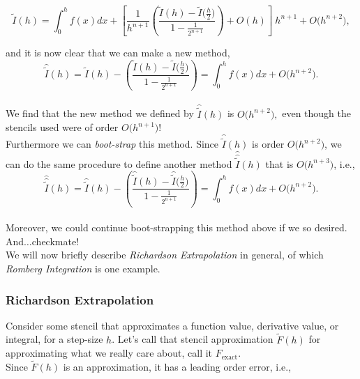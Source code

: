 \documentclass[paper=a4, fontsize=11pt]{scrartcl} %
\numberwithin{equation}{section} %
\numberwithin{figure}{section} %
\numberwithin{table}{section} %
\begin{document}
 $$\tilde{I}(h) = \int_0^h f(x) dx + \left[\frac{1}{h^{n+1}} \left( \frac{\tilde{I}(h) - \tilde{I}\bigg(\frac{h}{2}\bigg) }{1-\frac{1}{2^{n+1}}}\right) + O(h)  \right]\ h^{n+1} + O\big(h^{n+2}\big),$$
 
 and it is now clear that we can make a new method, \\
 
 $$\hat{\tilde{I}}(h) = \tilde{I}(h) - \left( \frac{\tilde{I}(h) - \tilde{I}\bigg(\frac{h}{2}\bigg) }{1-\frac{1}{2^{n+1}}}\right)  = \int_0^h f(x) dx + O\big(h^{n+2}\big).$$\\
 
 We find that the new method we defined by $\hat{\tilde{I}}(h)$ is $O\big(h^{n+2}\big),$ even though the stencils used were of order $O\big(h^{n+1}\big)!$\\
 
Furthermore we can \emph{boot-strap} this method. Since $\hat{\tilde{I}}(h)$ is order $O\big(h^{n+2}\big)$, we can do the same procedure to define another method $\hat{\hat{\tilde{I}}}(h)$ that is $O\big(h^{n+3} \big)$, i.e.,\\

$$\hat{\hat{\tilde{I}}}(h) = \hat{\tilde{I}}(h) - \left( \frac{\hat{\tilde{I}}(h) - \hat{\tilde{I}}\bigg(\frac{h}{2}\bigg) }{1-\frac{1}{2^{n+1}}}\right)  = \int_0^h f(x) dx + O\big(h^{n+2}\big).$$\\

Moreover, we could continue boot-strapping this method above if we so desired. And$\ldots$checkmate! \\

We will now briefly describe \emph{Richardson Extrapolation} in general, of which \emph{Romberg Integration} is one example. \\


%
%
% 
%
%
%
\subsubsection{Richardson Extrapolation}
 
 $ $\\
 
 Consider some stencil that approximates a function value, derivative value, or integral, for a step-size $h$. Let's call that stencil approximation $\tilde{F}(h)$ for approximating what we really care about, call it $F_{\mbox{exact}}$.\\
 
 Since $\tilde{F}(h)$ is an approximation, it has a leading order error, i.e., \\
 
\end{document}
